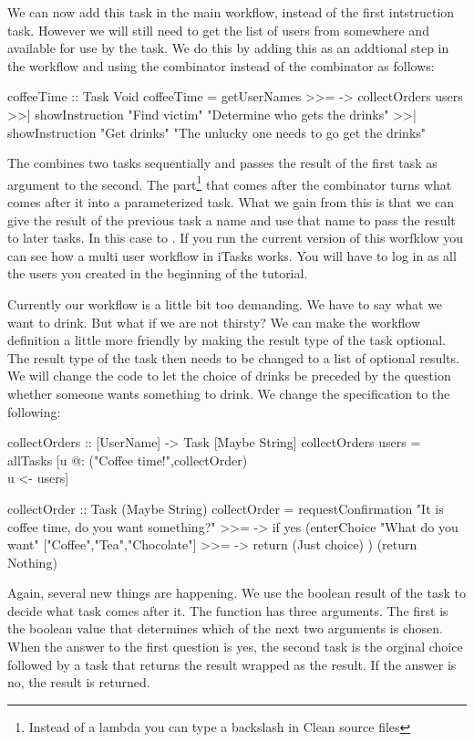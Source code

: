 \documentclass[a4paper,11pt]{article}
\begin{document}
We can now add this task in the main workflow, instead of the first intstruction task. However we will still need to get the list of users from somewhere and available for use by the  task. We do this by adding this as an addtional step in the workflow and using the \CleanInline{>>=} combinator instead of the \CleanInline{>>|} combinator as follows:
\begin{CleanCode}
coffeeTime :: Task Void
coffeeTime
  =   getUserNames
  >>= \users ->
      collectOrders users
  >>| showInstruction "Find victim" "Determine who gets the drinks"
  >>| showInstruction "Get drinks" "The unlucky one needs to go get the drinks"
\end{CleanCode}
The \CleanInline{>>=} combines two tasks sequentially and passes the result of the first task as argument to the second. The \CleanInline{\\users ->} part\footnote{Instead of a lambda you can type a backslash in Clean source files} that comes after the \CleanInline{>>=} combinator turns what comes after it into a parameterized task. What we gain from this is that we can give the result of the previous task a name and use that name to pass the result to later tasks. In this case to . If you run the current version of this worfklow you can see how a multi user workflow in iTasks works. You will have to log in as all the users you created in the beginning of the tutorial.

Currently our workflow is a little bit too demanding. We have to say what we want to drink. But what if we are not thirsty? We can make the workflow definition a little more friendly by making the result type of the  task optional. The result type of the  task then needs to be changed to a list of optional results. We will change the code to let the choice of drinks be preceded by the question whether someone wants something to drink. We change the specification to the following:
\begin{CleanCode}
collectOrders :: [UserName] -> Task [Maybe String]
collectOrders users = allTasks [u @: ("Coffee time!",collectOrder) \\ u <- users]

collectOrder :: Task (Maybe String)
collectOrder
    =   requestConfirmation "It is coffee time, do you want something?"
    >>= \yes -> if yes
        (enterChoice "What do you want" ["Coffee","Tea","Chocolate"]
         >>= \choice -> return (Just choice)
        )
        (return Nothing)
\end{CleanCode}
Again, several new things are happening. We use the boolean result of the  task to decide what task comes after it.
The  function has three arguments. The first is the boolean value that determines which of the next two arguments is chosen. When the answer to the first question is yes, the second task is the orginal choice followed by a task that returns the result wrapped as  the result. If the answer is no, the result  is returned.
\end{document}
